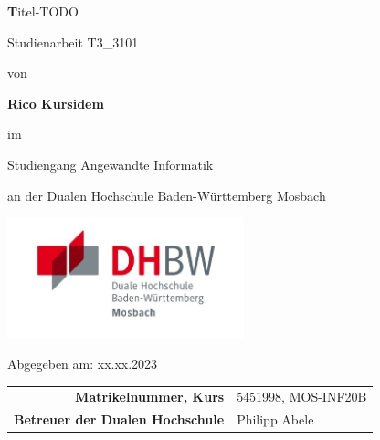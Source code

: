 
\def\title{Titel-TODO}
\def\abgabe{xx.xx.2023}

\begin{titlepage}
	
	
	
	\vspace{5pt}
	
	\begin{center}
		
		\Large \textbf\title
		
		\vspace{50pt}
		
		\large Studienarbeit T3\_3101
		
		von 
		
		\large \textbf{Rico Kursidem} 
		
		\vspace{15pt}
		
		im
		
		\large Studiengang Angewandte Informatik
		
		an der Dualen Hochschule Baden-Württemberg Mosbach

        \vspace{10pt}

        \includegraphics[height=3.5cm]{images/dhbw-logo.jpg}
		
		\vspace{20pt}
		
		\large Abgegeben am: \abgabe
		
		\vspace{30pt}

		
		\begin{table}[h]
			\centering
			\begin{tabular}{r l}
				\large\textbf{Matrikelnummer, Kurs} & \large 5451998, MOS-INF20B \\
                \large\textbf{Betreuer der Dualen Hochschule} & \large Philipp Abele \\
			\end{tabular}
			
		\end{table}
		
	\end{center}
	
	
\end{titlepage}